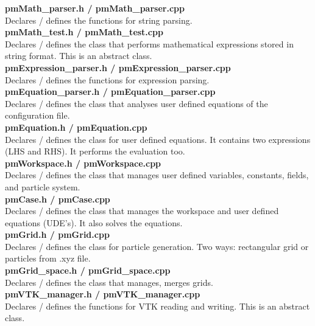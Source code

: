 \documentclass[a4paper,12pt,openany]{book}
\theoremstyle{break}
\begin{document}
\textbf{pmMath\_parser.h / pmMath\_parser.cpp} \\
Declares / defines the functions for string parsing. \\

\textbf{pmMath\_test.h / pmMath\_test.cpp} \\
Declares / defines the class that performs mathematical expressions stored in string format. This is an abstract class. \\

\textbf{pmExpression\_parser.h / pmExpression\_parser.cpp} \\
Declares / defines the functions for expression parsing. \\

\textbf{pmEquation\_parser.h / pmEquation\_parser.cpp} \\
Declares / defines the class that analyses user defined equations of the configuration file. \\

\textbf{pmEquation.h / pmEquation.cpp} \\
Declares / defines the class for user defined equations. It contains two expressions (LHS and RHS). It performs the evaluation too. \\

\textbf{pmWorkspace.h / pmWorkspace.cpp} \\
Declares / defines the class that manages user defined variables, constants, fields, and particle system. \\

\textbf{pmCase.h / pmCase.cpp} \\
Declares / defines the class that manages the workspace and user defined equations (UDE's). It also solves the equations. \\

\textbf{pmGrid.h / pmGrid.cpp} \\
Declares / defines the class for particle generation. Two ways: rectangular grid or particles from .xyz file. \\

\textbf{pmGrid\_space.h / pmGrid\_space.cpp} \\
Declares / defines the class that manages, merges grids. \\

\textbf{pmVTK\_manager.h / pmVTK\_manager.cpp} \\
Declares / defines the functions for VTK reading and writing. This is an abstract class. \\
\end{document}

